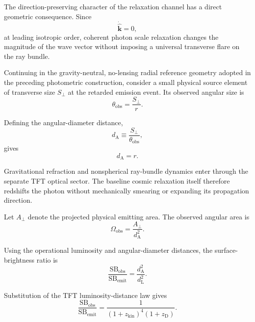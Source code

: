 The direction-preserving character of the relaxation channel has a direct geometric consequence. Since
\begin{equation}
    \dot{\hat{\mathbf{k}}}
    =
    0,
\end{equation}
at leading isotropic order, coherent photon scale relaxation changes the magnitude of the wave vector without imposing a universal transverse flare on the ray bundle.

Continuing in the gravity-neutral, no-lensing radial reference geometry adopted in the preceding photometric construction, consider a small physical source element of transverse size $S_\perp$ at the retarded emission event. Its observed angular size is
\begin{equation}
    \theta_{\mathrm{obs}}
    =
    \frac{S_\perp}{r}.
\end{equation}

Defining the angular-diameter distance,
\begin{equation}
    d_{\mathrm A}
    \equiv
    \frac{S_\perp}{\theta_{\mathrm{obs}}},
\end{equation}
gives
\begin{equation}
    d_{\mathrm A}
    =
    r.
\end{equation}

Gravitational refraction and nonspherical ray-bundle dynamics enter through the separate TFT optical sector. The baseline cosmic relaxation itself therefore redshifts the photon without mechanically smearing or expanding its propagation direction.

Let $A_\perp$ denote the projected physical emitting area. The observed angular area is
\begin{equation}
    \Omega_{\mathrm{obs}}
    =
    \frac{A_\perp}{d_{\mathrm A}^2}.
\end{equation}

Using the operational luminosity and angular-diameter distances, the surface-brightness ratio is
\begin{equation}
    \frac{\mathrm{SB}_{\mathrm{obs}}}
    {\mathrm{SB}_{\mathrm{emit}}}
    =
    \frac{d_{\mathrm A}^2}{d_{\mathrm L}^2}.
\end{equation}

Substitution of the TFT luminosity-distance law gives
\begin{equation}
    \frac{\mathrm{SB}_{\mathrm{obs}}}
    {\mathrm{SB}_{\mathrm{emit}}}
    =
    \frac{1}
    {(1+z_{\mathrm{kin}})^4(1+z_{\mathrm D})}.
\end{equation}

